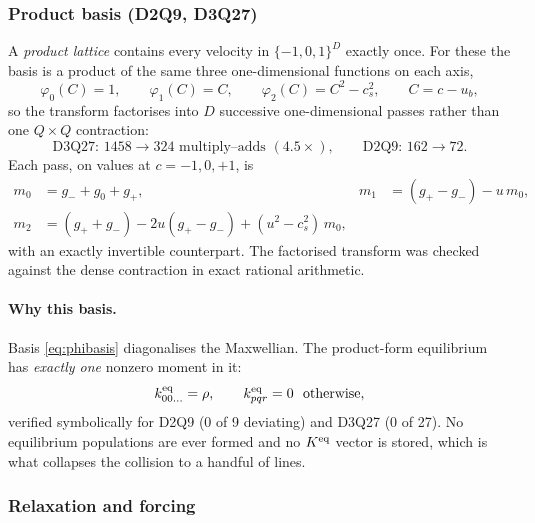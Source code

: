 \documentclass[11pt,a4paper]{article}
\newcommand{\cs}{c_s}
\begin{document}
\subsubsection{Product basis (D2Q9, D3Q27)}

A \emph{product lattice} contains every velocity in $\{-1,0,1\}^D$ exactly once.
For these the basis is a product of the same three one-dimensional functions on
each axis,
\begin{equation}
  \varphi_0(C)=1,\qquad \varphi_1(C)=C,\qquad \varphi_2(C)=C^2-\cs^2,
  \qquad C = c-u_b,
  \label{eq:phibasis}
\end{equation}
so the transform factorises into $D$ successive one-dimensional passes rather
than one $Q\times Q$ contraction:
\begin{equation}
  \text{D3Q27: } 1458 \to 324 \text{ multiply--adds } (4.5\times), \qquad
  \text{D2Q9: } 162 \to 72 .
\end{equation}
Each pass, on values at $c=-1,0,+1$, is
\begin{align}
  m_0 &= g_- + g_0 + g_+, &
  m_1 &= (g_+ - g_-) - u\,m_0, \\
  m_2 &= (g_+ + g_-) - 2u(g_+ - g_-) + (u^2-\cs^2)\,m_0,
\end{align}
with an exactly invertible counterpart. The factorised transform was checked
against the dense contraction in exact rational arithmetic.

\paragraph{Why this basis.} Basis \eqref{eq:phibasis} diagonalises the Maxwellian.
The product-form equilibrium has \emph{exactly one} nonzero moment in it:
\begin{equation}
  k^{\rm eq}_{00\ldots} = \rho, \qquad
  k^{\rm eq}_{pqr} = 0 \ \ \text{otherwise},
\end{equation}
verified symbolically for D2Q9 (0 of 9 deviating) and D3Q27 (0 of 27). No
equilibrium populations are ever formed and no $K^{\rm eq}$ vector is stored,
which is what collapses the collision to a handful of lines.

\subsubsection{Relaxation and forcing}
\end{document}
